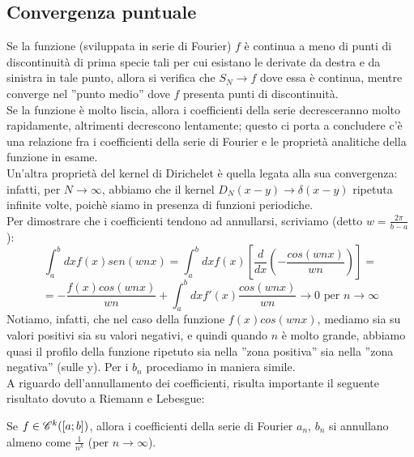 \subsection{Convergenza puntuale}
Se la funzione (sviluppata in serie di Fourier) $f$ è continua a meno di punti di discontinuità di prima specie tali per cui esistano le derivate da destra e da sinistra in tale punto, allora si verifica che $S_N \to f$ dove essa è continua, mentre converge nel ''punto medio'' dove $f$ presenta punti di discontinuità.\\
Se la funzione è molto liscia, allora i coefficienti della serie decresceranno molto rapidamente, altrimenti decrescono lentamente; questo ci porta a concludere c'è una relazione fra i coefficienti della serie di Fourier e le proprietà analitiche della funzione in esame.\\
Un'altra proprietà del kernel di Dirichelet è quella legata alla sua convergenza: infatti, per $N \to \infty$, abbiamo che il kernel $D_N(x-y) \to \delta (x-y)$ ripetuta infinite volte, poichè siamo in presenza di funzioni periodiche.\\
Per dimostrare che i coefficienti tendono ad annullarsi, scriviamo (detto $w=\frac{2 \pi}{b-a}$):
$$\int_a^b dx f(x) sen(wnx)=\int_a^b dx f(x) \left[\frac{d}{dx}\left(-\frac{cos(wnx)}{wn}\right)\right]=$$
$$=-\frac{f(x)cos(wnx)}{wn} + \int_a^b dx f'(x) \frac{cos(wnx)}{wn} \to 0 \text{ per } n \to \infty$$
Notiamo, infatti, che nel caso della funzione $f(x)cos(wnx)$, mediamo sia su valori positivi sia su valori negativi, e quindi quando $n$ è molto grande, abbiamo quasi il profilo della funzione ripetuto sia nella ''zona positiva'' sia nella ''zona negativa'' (sulle y). Per i $b_n$ procediamo in maniera simile.\\
A riguardo dell'annullamento dei coefficienti, risulta importante il seguente risultato dovuto a Riemann e Lebesgue:
\begin{teorema}
Se $f \in \mathscr{C}^k([a;b])$, allora i coefficienti della serie di Fourier $a_n$, $b_n$ si annullano almeno come $\frac{1}{n^k}$ (per $n \to \infty$).
\end{teorema}
